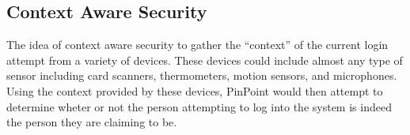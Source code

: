 \documentclass[12pt,journal]{IEEEtran}
\begin{document}
\subsection{Context Aware Security}
The  idea  of  context  aware  security  to  gather  the “context”  of  the  current  login  attempt  from  a  variety  of devices.  These devices could include almost any type of sensor  including  card  scanners,  thermometers,  motion sensors,  and  microphones.    Using  the  context  provided by   these   devices,   PinPoint   would   then   attempt   to determine wheter or not the person attempting to log into the system is indeed the person they are claiming to be.
\end{document}
